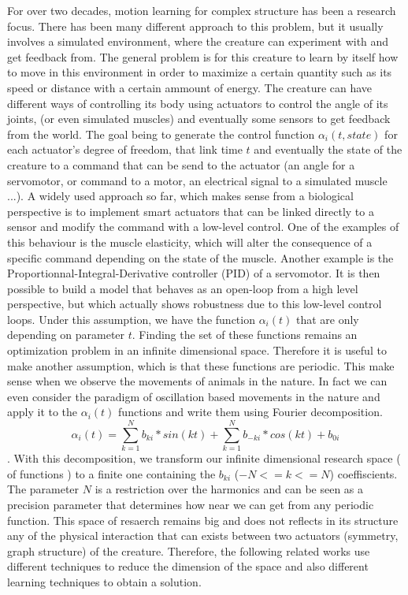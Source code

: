 For over two decades, motion learning for complex structure has been a research focus. There has been many different approach to this problem, but it usually involves a simulated environment, where the creature can experiment with and get feedback from. The general problem is for this creature to learn by itself how to move in this environment in order to maximize a certain quantity such as its speed or distance with a certain ammount of energy. The creature can have different ways of controlling its body using actuators to control the angle of its joints, (or even simulated muscles) and eventually some sensors to get feedback from the world. The goal being to generate the control function  $\alpha_i(t, state) $ for each actuator's degree of freedom, that link time $t$ and eventually the state of the creature to a command that can be send to the actuator (an angle for a servomotor, or command to a motor, an electrical signal to a simulated muscle ...). A widely used approach so far, which makes sense from a biological perspective is to implement smart actuators that can be linked directly to a sensor and modify the command with a low-level control. One of the examples of this behaviour is the muscle elasticity, which will alter the consequence of a specific command depending on the state of the muscle. Another example is the Proportionnal-Integral-Derivative controller (PID) of a servomotor. It is then possible to build a model that behaves as an open-loop from a high level perspective, but which actually shows robustness due to this low-level control loops. 
Under this assumption, we have the function $\alpha_i(t)$ that are only depending on parameter $t$. Finding the set of these functions remains an optimization problem in an infinite dimensional space. Therefore it is useful to make another assumption, which is that these functions are periodic. This make sense when we observe the movements of animals in the nature. In fact we can even consider the paradigm of oscillation based movements in the nature and apply it to the $\alpha_i(t)$ functions and write them using Fourier decomposition. $$\alpha_i(t) = \sum_{k = 1}^N {b_{ki} * sin(kt)} + \sum_{k = 1}^N {b_{-ki} *  cos(kt)} + b_{0i} $$.
With this decomposition, we transform our infinite dimensional research space ( of functions ) to a finite one containing the $b_{ki}$ ($ -N <= k <= N $) coeffiscients. The parameter $N$ is a restriction over the harmonics and can be seen as a precision parameter that determines how near we can get from any periodic function. This space of resaerch remains big and does not reflects in its structure any of the physical interaction that can exists between two actuators (symmetry, graph structure) of the creature. Therefore, the following related works use different techniques to reduce the dimension of the space and also different learning techniques to obtain a solution. 

